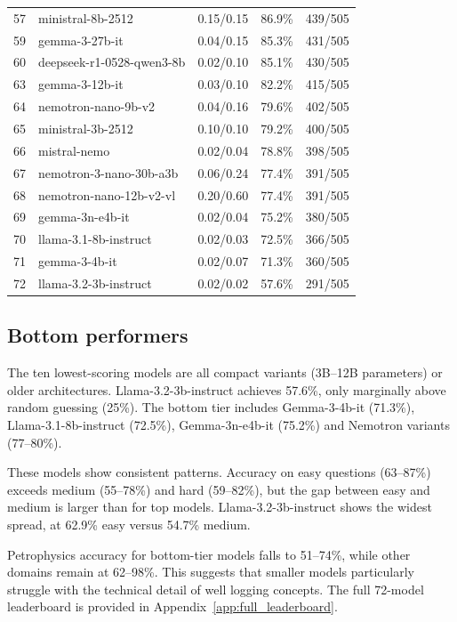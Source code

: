 \documentclass[11pt]{article}
\begin{document}
\begin{longtable}{rllrr}
  57 & ministral-8b-2512 & 0.15/0.15 & 86.9\% & 439/505 \\
  59 & gemma-3-27b-it & 0.04/0.15 & 85.3\% & 431/505 \\
  60 & deepseek-r1-0528-qwen3-8b & 0.02/0.10 & 85.1\% & 430/505 \\
  63 & gemma-3-12b-it & 0.03/0.10 & 82.2\% & 415/505 \\
  64 & nemotron-nano-9b-v2 & 0.04/0.16 & 79.6\% & 402/505 \\
  65 & ministral-3b-2512 & 0.10/0.10 & 79.2\% & 400/505 \\
  66 & mistral-nemo & 0.02/0.04 & 78.8\% & 398/505 \\
  67 & nemotron-3-nano-30b-a3b & 0.06/0.24 & 77.4\% & 391/505 \\
  68 & nemotron-nano-12b-v2-vl & 0.20/0.60 & 77.4\% & 391/505 \\
  69 & gemma-3n-e4b-it & 0.02/0.04 & 75.2\% & 380/505 \\
  70 & llama-3.1-8b-instruct & 0.02/0.03 & 72.5\% & 366/505 \\
  71 & gemma-3-4b-it & 0.02/0.07 & 71.3\% & 360/505 \\
  72 & llama-3.2-3b-instruct & 0.02/0.02 & 57.6\% & 291/505 \\
\end{longtable}

\FloatBarrier
\subsection{Bottom performers}

The ten lowest-scoring models are all compact variants (3B--12B parameters) or older architectures. Llama-3.2-3b-instruct achieves 57.6\%, only marginally above random guessing (25\%). The bottom tier includes Gemma-3-4b-it (71.3\%), Llama-3.1-8b-instruct (72.5\%), Gemma-3n-e4b-it (75.2\%) and Nemotron variants (77--80\%).

These models show consistent patterns. Accuracy on easy questions (63--87\%) exceeds medium (55--78\%) and hard (59--82\%), but the gap between easy and medium is larger than for top models. Llama-3.2-3b-instruct shows the widest spread, at 62.9\% easy versus 54.7\% medium.

Petrophysics accuracy for bottom-tier models falls to 51--74\%, while other domains remain at 62--98\%. This suggests that smaller models particularly struggle with the technical detail of well logging concepts. The full 72-model leaderboard is provided in Appendix~\ref{app:full_leaderboard}.
\end{document}
